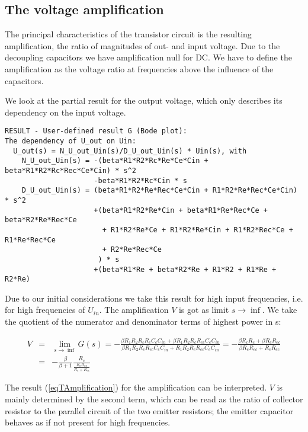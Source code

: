 \subsection{The voltage amplification}

The principal characteristics of the transistor circuit is the resulting
amplification, the ratio of magnitudes of out- and input voltage. Due to
the decoupling capacitors we have amplification null for DC. We have to
define the amplification as the voltage ratio at frequencies above the
influence of the capacitors.

We look at the partial result for the output voltage, which only describes
its dependency on the input voltage.

\begin{verbatim}
RESULT - User-defined result G (Bode plot):
The dependency of U_out on Uin:
  U_out(s) = N_U_out_Uin(s)/D_U_out_Uin(s) * Uin(s), with
    N_U_out_Uin(s) = -(beta*R1*R2*Rc*Re*Ce*Cin + beta*R1*R2*Rc*Rec*Ce*Cin) * s^2
                     -beta*R1*R2*Rc*Cin * s
    D_U_out_Uin(s) = (beta*R1*R2*Re*Rec*Ce*Cin + R1*R2*Re*Rec*Ce*Cin) * s^2
                     +(beta*R1*R2*Re*Cin + beta*R1*Re*Rec*Ce + beta*R2*Re*Rec*Ce
                       + R1*R2*Re*Ce + R1*R2*Re*Cin + R1*R2*Rec*Ce + R1*Re*Rec*Ce
                       + R2*Re*Rec*Ce
                      ) * s
                     +(beta*R1*Re + beta*R2*Re + R1*R2 + R1*Re + R2*Re)
\end{verbatim}

Due to our initial considerations we take this result for high input
frequencies, i.e. for high frequencies of $U_{in}$. The amplification $V$
is got as limit $s \to \inf$. We take the quotient of the numerator and
denominator terms of highest power in s:

\begin{eqnarray}
V & = & \lim_{s \to \inf}G(s)
        = - \frac{\beta R_1 R_2 R_c R_e C_e C_{in} + \beta R_1 R_2 R_c R_{ec} C_e C_{in}}
                 {\beta R_1 R_2 R_e R_{ec} C_e C_{in} + R_1 R_2 R_e R_{ec} C_e C_{in}}
        = - \frac{\beta R_c R_e + \beta R_c R_{ec}}{\beta R_e R_{ec} + R_e R_{ec}}
\nonumber \\
  & = & - \frac{\beta}{\beta+1} \frac{R_c}{\frac{R_e R_{ec}}{R_e+R_{ec}}}
\label{eqTAmplification}
\end{eqnarray}

The result (\ref{eqTAmplification}) for the amplification can be
interpreted. $V$ is mainly determined by the second term, which can be
read as the ratio of collector resistor to the parallel circuit of the two
emitter resistors; the emitter capacitor behaves as if not present for
high frequencies.

